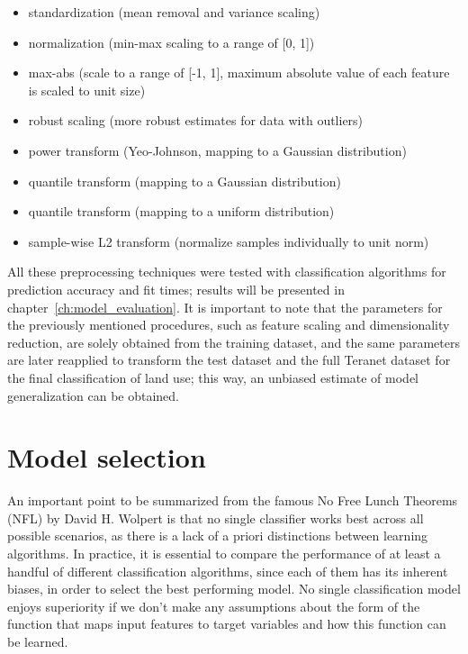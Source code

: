 \begin{itemize}
    \item standardization (mean removal and variance scaling)
    \item normalization (min-max scaling to a range of [0, 1])
    \item max-abs (scale to a range of [-1, 1], maximum absolute value of each feature is scaled to unit size)
    \item robust scaling (more robust estimates for data with outliers)
    \item power transform (Yeo-Johnson, mapping to a Gaussian distribution)
    \item quantile transform (mapping to a Gaussian distribution)
    \item quantile transform (mapping to a uniform distribution)
    \item sample-wise L2 transform (normalize samples individually to unit norm)
\end{itemize}

All these preprocessing techniques were tested with classification algorithms for prediction accuracy and fit times;
results will be presented in chapter~\ref{ch:model_evaluation}.
It is important to note that the parameters for the previously mentioned procedures, such as feature scaling and dimensionality reduction, are solely obtained from the training dataset, and the same parameters are later reapplied to transform the test dataset and the full Teranet dataset for the final classification of land use;
this way, an unbiased estimate of model generalization can be obtained.

\section{Model selection} \label{sec:model_selection}

An important point to be summarized from the famous No Free Lunch Theorems (NFL)\cite{Wolpert1996,Wolpert1997} by David H. Wolpert is that no single classifier works best across all possible scenarios, as there is a lack of a priori distinctions between learning algorithms.
In practice, it is essential to compare the performance of at least a handful of different classification algorithms, since each of them has its inherent biases, in order to select the best performing model.
No single classification model enjoys superiority if we don't make any assumptions about the form of the function that maps input features to target variables and how this function can be learned\cite{RaschkaMirjalili2017}.

